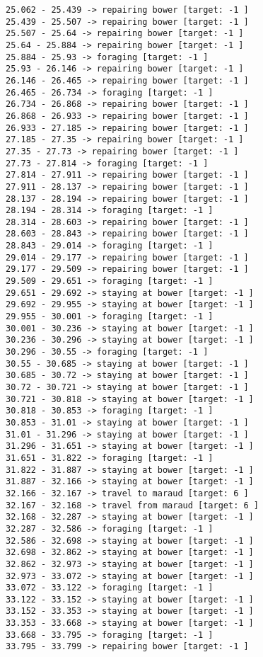 \documentclass[11pt]{article}
\begin{document}
\begin{Verbatim}[commandchars=\\\{\}]
25.062 - 25.439 -> repairing bower [target: -1 ]
25.439 - 25.507 -> repairing bower [target: -1 ]
25.507 - 25.64 -> repairing bower [target: -1 ]
25.64 - 25.884 -> repairing bower [target: -1 ]
25.884 - 25.93 -> foraging [target: -1 ]
25.93 - 26.146 -> repairing bower [target: -1 ]
26.146 - 26.465 -> repairing bower [target: -1 ]
26.465 - 26.734 -> foraging [target: -1 ]
26.734 - 26.868 -> repairing bower [target: -1 ]
26.868 - 26.933 -> repairing bower [target: -1 ]
26.933 - 27.185 -> repairing bower [target: -1 ]
27.185 - 27.35 -> repairing bower [target: -1 ]
27.35 - 27.73 -> repairing bower [target: -1 ]
27.73 - 27.814 -> foraging [target: -1 ]
27.814 - 27.911 -> repairing bower [target: -1 ]
27.911 - 28.137 -> repairing bower [target: -1 ]
28.137 - 28.194 -> repairing bower [target: -1 ]
28.194 - 28.314 -> foraging [target: -1 ]
28.314 - 28.603 -> repairing bower [target: -1 ]
28.603 - 28.843 -> repairing bower [target: -1 ]
28.843 - 29.014 -> foraging [target: -1 ]
29.014 - 29.177 -> repairing bower [target: -1 ]
29.177 - 29.509 -> repairing bower [target: -1 ]
29.509 - 29.651 -> foraging [target: -1 ]
29.651 - 29.692 -> staying at bower [target: -1 ]
29.692 - 29.955 -> staying at bower [target: -1 ]
29.955 - 30.001 -> foraging [target: -1 ]
30.001 - 30.236 -> staying at bower [target: -1 ]
30.236 - 30.296 -> staying at bower [target: -1 ]
30.296 - 30.55 -> foraging [target: -1 ]
30.55 - 30.685 -> staying at bower [target: -1 ]
30.685 - 30.72 -> staying at bower [target: -1 ]
30.72 - 30.721 -> staying at bower [target: -1 ]
30.721 - 30.818 -> staying at bower [target: -1 ]
30.818 - 30.853 -> foraging [target: -1 ]
30.853 - 31.01 -> staying at bower [target: -1 ]
31.01 - 31.296 -> staying at bower [target: -1 ]
31.296 - 31.651 -> staying at bower [target: -1 ]
31.651 - 31.822 -> foraging [target: -1 ]
31.822 - 31.887 -> staying at bower [target: -1 ]
31.887 - 32.166 -> staying at bower [target: -1 ]
32.166 - 32.167 -> travel to maraud [target: 6 ]
32.167 - 32.168 -> travel from maraud [target: 6 ]
32.168 - 32.287 -> staying at bower [target: -1 ]
32.287 - 32.586 -> foraging [target: -1 ]
32.586 - 32.698 -> staying at bower [target: -1 ]
32.698 - 32.862 -> staying at bower [target: -1 ]
32.862 - 32.973 -> staying at bower [target: -1 ]
32.973 - 33.072 -> staying at bower [target: -1 ]
33.072 - 33.122 -> foraging [target: -1 ]
33.122 - 33.152 -> staying at bower [target: -1 ]
33.152 - 33.353 -> staying at bower [target: -1 ]
33.353 - 33.668 -> staying at bower [target: -1 ]
33.668 - 33.795 -> foraging [target: -1 ]
33.795 - 33.799 -> repairing bower [target: -1 ]

\end{Verbatim}
\end{document}
